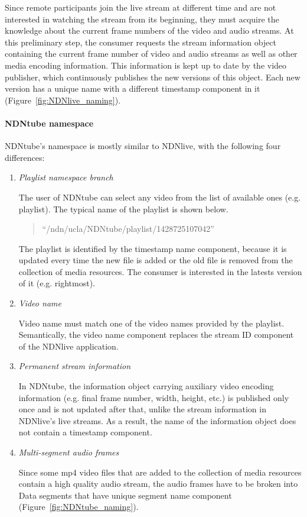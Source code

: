 Since remote participants join the live stream at different time and are not interested in watching the stream from its beginning, they must acquire the knowledge about the current frame numbers of the video and audio streams. At this preliminary step, the consumer requests the stream information object containing the current frame number of video and audio streams as well as other media encoding information. This information is kept up to date by the video publisher, which continuously publishes the new versions of this object. Each new version has a unique name with a different timestamp component in it (Figure~\ref{fig:NDNlive_naming}).


\paragraph{NDNtube namespace} %
\label{par:NDNtube_naming}
\vspace{0.3cm}

NDNtube's namespace is mostly similar to NDNlive, with the following four differences:
\begin{enumerate}
	\item{\textit{Playlist namespace branch}} 
		
		The user of NDNtube can select any video from the list of available ones (e.g. playlist). The typical name of the playlist is shown below.
		\begin{quote}
		``/ndn/ucla/NDNtube/playlist/1428725107042''
		\end{quote}
    The playlist is identified by the timestamp name component, because it is updated every time the new file is added or the old file is removed from the collection of media resources. The consumer is interested in the latests version of it (e.g. rightmost).
    
	\item{\textit{Video name}} 

		Video name must match one of the video names provided by the playlist. Semantically, the video name component replaces the stream ID component of the NDNlive application.

	\item{\textit{Permanent stream information}} 

    In NDNtube, the information object carrying auxiliary video encoding information (e.g. final frame number, width, height, etc.) is published only once and is not updated after that, unlike the stream information in NDNlive's live streams. As a result, the name of the information object does not contain a timestamp component.

	\item{\textit{Multi-segment audio frames}} 
	
   Since some mp4 video files that are added to the collection of media resources contain a high quality audio stream, the audio frames have to be broken into Data segments that have unique segment name component (Figure~\ref{fig:NDNtube_naming}).
\end{enumerate}

